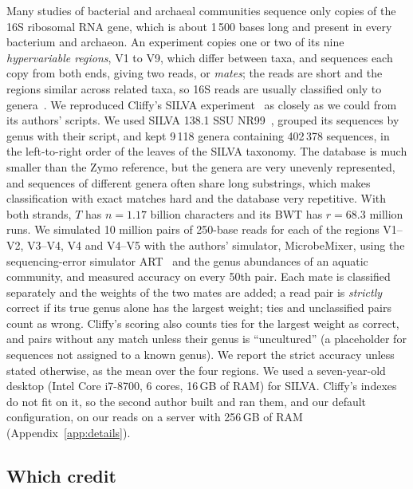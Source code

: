 Many studies of bacterial and archaeal communities sequence only copies of the 16S ribosomal RNA gene, which is about 1\,500 bases long and present in every bacterium and archaeon.
An experiment copies one or two of its nine \emph{hypervariable regions}, V1 to V9, which differ between taxa, and sequences each copy from both ends, giving two reads, or \emph{mates}; the reads are short and the regions similar across related taxa, so 16S reads are usually classified only to genera~\cite{JSL+19}.
We reproduced Cliffy's SILVA experiment~\cite{ABL25} as closely as we could from its authors' scripts.
We used SILVA 138.1 SSU NR99~\cite{QPY+13}, grouped its sequences by genus with their script, and kept 9\,118 genera containing 402\,378 sequences, in the left-to-right order of the leaves of the SILVA taxonomy.
The database is much smaller than the Zymo reference, but the genera are very unevenly represented, and sequences of different genera often share long substrings, which makes classification with exact matches hard and the database very repetitive.
With both strands, $T$ has $n = 1.17$ billion characters and its BWT has $r = 68.3$ million runs.
We simulated 10 million pairs of 250-base reads for each of the regions V1--V2, V3--V4, V4 and V4--V5 with the authors' simulator, MicrobeMixer, using the sequencing-error simulator ART~\cite{HLMM12} and the genus abundances of an aquatic community, and measured accuracy on every 50th pair.
Each mate is classified separately and the weights of the two mates are added; a read pair is \emph{strictly} correct if its true genus alone has the largest weight; ties and unclassified pairs count as wrong.
Cliffy's scoring also counts ties for the largest weight as correct, and pairs without any match unless their genus is ``uncultured'' (a placeholder for sequences not assigned to a known genus).
We report the strict accuracy unless stated otherwise, as the mean over the four regions.
We used a seven-year-old desktop (Intel Core i7-8700, 6 cores, 16\,GB of RAM) for SILVA.
Cliffy's indexes do not fit on it, so the second author built and ran them, and our default configuration, on our reads on a server with 256\,GB of RAM (Appendix~\ref{app:details}).

\subsection{Which credit}
\label{sec:accuracy}

